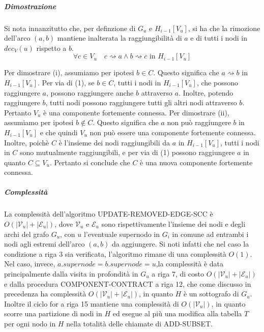 \subparagraph{Dimostrazione}
Si nota innanzitutto che, per definzione di $G_u$ e $H_{i-1}[V_u]$, si ha che la rimozione dell'arco $(a, b)$
mantiene inalterata la raggiungibilit\`a di $a$ e di tutti i nodi in $dec_V(u)$ rispetto a $b$.
\begin{equation*}
        \forall c \in V_u
        \quad c \rightsquigarrow a \land b \rightsquigarrow c
        \text{ in } H_{i-1}[V_u]
\end{equation*}

Per dimostrare (i), assumiamo per ipotesi $b \in C$.
Questo significa che $a \rightsquigarrow b$ in $H_{i-1}[V_u]$.
Per via di (1), se $b \in C$, tutti i nodi in $H_{i-1}[V_u]$, che possono raggiungere $a$, possono raggiungere
anche $b$ attraverso $a$.
Inoltre, potendo raggiungere $b$, tutti nodi possono raggiungere tutti gli altri nodi attraverso $b$.
Pertanto $V_u$ \`e una componente fortemente connessa. \newline
Per dimostrare (ii), assumiamo per ipotesi $b \notin C$.
Questo significa che $a$ non pu\`o raggiungere $b$ in $H_{i-1}[V_u]$ e che quindi $V_u$ non pu\`o essere
una componente fortemente connessa.
Inoltre, poich\`e $C$ \`e l'insieme dei nodi raggiungibili da $a$ in $H_{i-1}[V_u]$, tutti
i nodi in $C$ sono mutualmente raggiungibili, e per via di (1) possono raggiungere $a$ in quanto $C \subseteq V_u$.
Pertanto si conclude che $C$ \`e una nuova componente fortemente connessa.

\subparagraph{Complessità}
La complessit\`a dell'algoritmo UPDATE-REMOVED-EDGE-SCC \`e $O(|\mathcal{V}_u|+|\mathcal{E}_u|)$, dove $\mathcal{V}_u$ e
$\mathcal{E}_u$ sono rispettivamente l'insieme dei nodi e degli archi del grafo $G_u$, con $u$ l'eventuale
supernodo in $G_i$ in comune ad entrambi i nodi agli estremi dell'arco $(a, b)$ da aggiungere.
Si noti infatti che nel caso la condizione a riga 3 sia verificata, l'algoritmo rimane di una complessit\`a
$O(1)$.
Nel caso, invece, $a.supernode = b.supernode = u$,la complessit\`a \`e data principalmente dalla visita in profondit\`a
in $G_u$ a riga 7, di costo $O(|\mathcal{V}_u|+|\mathcal{E}_u|)$ e dalla procedura COMPONENT-CONTRACT a riga 12, che
come discusso in precedenza ha complessit\`a $O(|\mathcal{V}_u|+|\mathcal{E}_u|)$, in quanto $H$ \`e un sottografo di
$G_u$.
Inoltre il ciclo for a riga 15 mantiene una complessit\`a di $O(|\mathcal{V}_u|)$, in quanto scorre una
partizione di nodi in $H$ ed esegue al pi\`u una modifica alla tabella $T$ per ogni nodo in $H$ nella totalit\`a
delle chiamate di ADD-SUBSET.